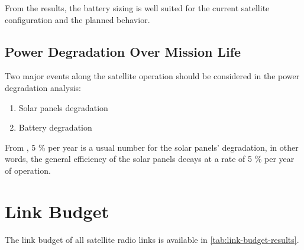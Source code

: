 From the results, the battery sizing is well suited for the current satellite configuration and the planned behavior.

\subsection{Power Degradation Over Mission Life}

Two major events along the satellite operation should be considered in the power degradation analysis:

\begin{enumerate}
    \item Solar panels degradation
    \item Battery degradation
\end{enumerate}

From \cite{larson2005}, 5 \% per year is a usual number for the solar panels' degradation, in other words, the general efficiency of the solar panels decays at a rate of 5 \% per year of operation.%


\section{Link Budget}

The link budget of all satellite radio links is available in \autoref{tab:link-budget-results}.

